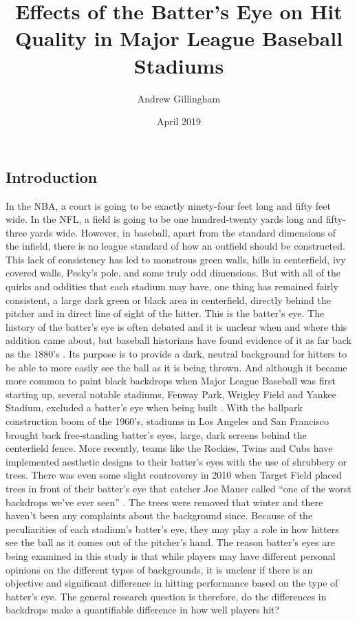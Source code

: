 \documentclass{article}
\title{Effects of the Batter's Eye on Hit Quality in Major League Baseball Stadiums }
\author{Andrew Gillingham }
\date{April 2019}
\begin{document}
\maketitle
\begin{doublespace}
\section{Introduction}
In the NBA, a court is going to be exactly ninety-four feet long and fifty feet wide. In the NFL, a field is going to be one hundred-twenty yards long and fifty-three yards wide. However, in baseball, apart from the standard dimensions of the infield, there is no league standard of how an outfield should be constructed. This lack of consistency has led to monstrous green walls, hills in centerfield, ivy covered walls, Pesky’s pole, and some truly odd dimensions. But with all of the quirks and oddities that each stadium may have, one thing has remained fairly consistent, a large dark green or black area in centerfield, directly behind the pitcher and in direct line of sight of the hitter. This is the batter’s eye. 
The history of the batter’s eye is often debated and it is unclear when and where this addition came about, but baseball historians have found evidence of it as far back as the 1880’s \citep{Holmes}. Its purpose is to provide a dark, neutral background for hitters to be able to more easily see the ball as it is being thrown. And although it became more common to paint black backdrops when Major League Baseball was first starting up, several notable stadiums, Fenway Park, Wrigley Field and Yankee Stadium, excluded a batter’s eye when being built \citep{Borzi}. With the ballpark construction boom of the 1960’s, stadiums in Los Angeles and San Francisco brought back free-standing batter’s eyes, large, dark screens behind the centerfield fence. More recently, teams like the Rockies, Twins and Cubs have implemented aesthetic designs to their batter’s eyes with the use of shrubbery or trees. There was even some slight controversy in 2010 when Target Field placed trees in front of their batter’s eye that catcher Joe Mauer called “one of the worst backdrops we’ve ever seen” \citep{Gleeman}. The trees were removed that winter and there haven’t been any complaints about the background since. Because of the peculiarities of each stadium’s batter’s eye, they may play a role in how hitters see the ball as it comes out of the pitcher’s hand. The reason batter’s eyes are being examined in this study is that while players may have different personal opinions on the different types of backgrounds, it is unclear if there is an objective and significant difference in hitting performance based on the type of batter’s eye. The general research question is therefore, do the differences in backdrops make a quantifiable difference in how well players hit?


\end{doublespace}
\end{document}
